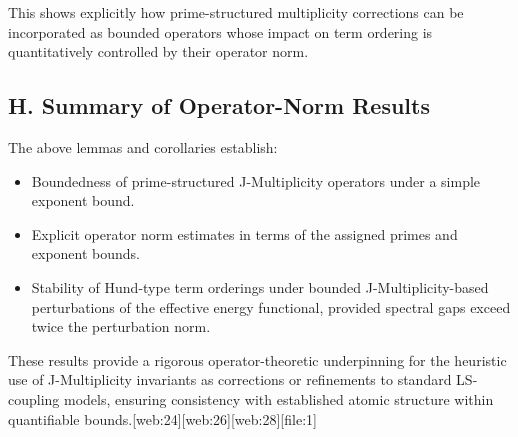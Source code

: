 \documentclass[11pt]{article}
\begin{document}
This shows explicitly how prime-structured multiplicity corrections can be incorporated as bounded operators whose impact on term ordering is quantitatively controlled by their operator norm.

\subsection*{H. Summary of Operator-Norm Results}

The above lemmas and corollaries establish:
\begin{itemize}
  \item Boundedness of prime-structured J-Multiplicity operators under a simple exponent bound.
  \item Explicit operator norm estimates in terms of the assigned primes and exponent bounds.
  \item Stability of Hund-type term orderings under bounded J-Multiplicity-based perturbations of the effective energy functional, provided spectral gaps exceed twice the perturbation norm.
\end{itemize}

These results provide a rigorous operator-theoretic underpinning for the heuristic use of J-Multiplicity invariants as corrections or refinements to standard LS-coupling models, ensuring consistency with established atomic structure within quantifiable bounds.[web:24][web:26][web:28][file:1]


\nocite{*}
  

\end{document}
